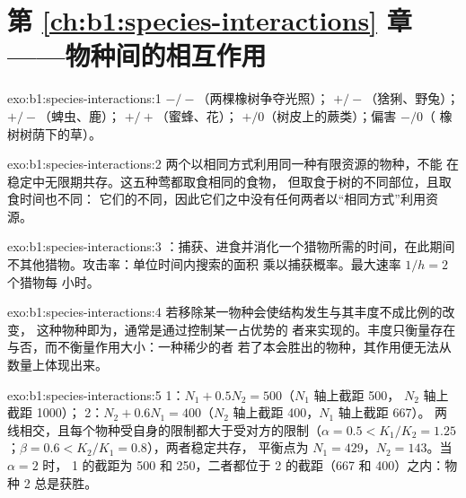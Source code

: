 \section*{第 \ref{ch:b1:species-interactions} 章——物种间的相互作用}

\begin{solution}{exo:b1:species-interactions:1}
 $-/-$（两棵橡树争夺光照）； $+/-$（猞猁、野兔）；
 $+/-$（蜱虫、鹿）； $+/+$（蜜蜂、花）；
 $+/0$（树皮上的蕨类）；偏害 $-/0$（
橡树树荫下的草）。
\end{solution}

\begin{solution}{exo:b1:species-interactions:2}
两个以相同方式利用同一种有限资源的物种，不能
在稳定中无限期共存。这五种莺都取食相同的食物，
但取食于树的不同部位，且取食时间也不同：
它们的不同，因此它们之中没有任何两者以“相同方式”利用资源。
\end{solution}

\begin{solution}{exo:b1:species-interactions:3}
：捕获、进食并消化一个猎物所需的时间，在此期间
不其他猎物。攻击率：单位时间内搜索的面积
乘以捕获概率。最大速率 $1/h = 2$ 个猎物每
小时。
\end{solution}

\begin{solution}{exo:b1:species-interactions:4}
若移除某一物种会使结构发生与其丰度不成比例的改变，
这种物种即为，通常是通过控制某一占优势的
者来实现的。丰度只衡量存在与否，而不衡量作用大小：一种稀少的者
若了本会胜出的物种，其作用便无法从数量上体现出来。
\end{solution}

\begin{solution}{exo:b1:species-interactions:5}
 1：$N_1 + 0.5 N_2 = 500$（$N_1$ 轴上截距 500，
$N_2$ 轴上截距 1000）； 2：$N_2 + 0.6 N_1 = 400$（$N_2$ 轴上截距 400，$N_1$ 轴上截距 667）。
两线相交，且每个物种受自身的限制都大于受对方的限制（$\alpha = 0.5 <
K_1/K_2 = 1.25$；$\beta = 0.6 < K_2/K_1 = 0.8$），两者稳定共存，
平衡点为 $N_1 = 429$，$N_2 = 143$。当 $\alpha = 2$ 时， 1 的截距为
500 和 250，二者都位于 2 的截距（667 和 400）之内：物种 2
总是获胜。
\end{solution}

